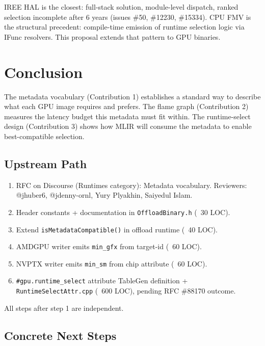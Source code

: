 \documentclass[11pt]{article}
\begin{document}
IREE HAL is the closest: full-stack solution, module-level dispatch, ranked selection incomplete after 6 years (issues \#50, \#12230, \#15334).
CPU FMV is the structural precedent: compile-time emission of runtime selection logic via IFunc resolvers.
This proposal extends that pattern to GPU binaries.

\section{Conclusion}

The metadata vocabulary (Contribution 1) establishes a standard way to describe what each GPU image requires and prefers.
The flame graph (Contribution 2) measures the latency budget this metadata must fit within.
The runtime-select design (Contribution 3) shows how MLIR will consume the metadata to enable best-compatible selection.

\subsection{Upstream Path}

\begin{enumerate}
  \item RFC on Discourse (Runtimes category): Metadata vocabulary. Reviewers: @jhuber6, @jdenny-ornl, Yury Plyakhin, Saiyedul Islam.
  \item Header constants + documentation in \texttt{OffloadBinary.h} (~30 LOC).
  \item Extend \texttt{isMetadataCompatible()} in offload runtime (~40 LOC).
  \item AMDGPU writer emits \texttt{min\_gfx} from target-id (~60 LOC).
  \item NVPTX writer emits \texttt{min\_sm} from chip attribute (~60 LOC).
  \item \texttt{\#gpu.runtime\_select} attribute TableGen definition + \texttt{RuntimeSelectAttr.cpp} (~600 LOC), pending RFC \#88170 outcome.
\end{enumerate}

All steps after step 1 are independent.

\subsection{Concrete Next Steps}
\end{document}
